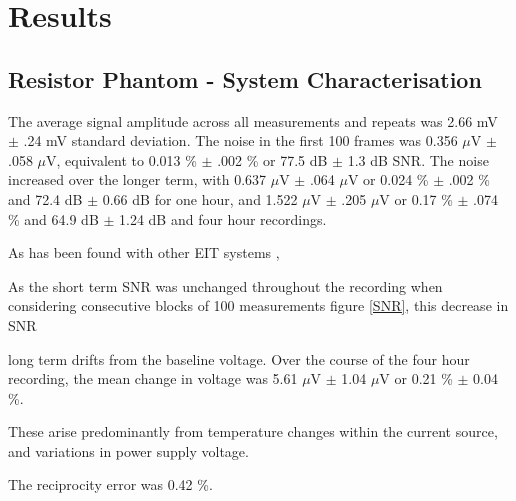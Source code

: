\section{Results}
\subsection{Resistor Phantom - System Characterisation}
The average signal amplitude across all measurements and repeats was 2.66 mV $\pm$ .24 mV standard deviation. The noise in the first 100 frames was 0.356 $\mu$V $\pm$ .058 $\mu$V, equivalent to 0.013 \% $\pm$ .002 \% or 77.5 dB $\pm$ 1.3 dB SNR. The noise increased over the longer term, with 0.637 $\mu$V $\pm$ .064 $\mu$V or 0.024 \% $\pm$ .002 \% and 72.4 dB $\pm$ 0.66 dB for one hour, and 1.522 $\mu$V $\pm$ .205 $\mu$V or 0.17 \% $\pm$ .074 \% and 64.9 dB $\pm$ 1.24 dB and four hour recordings.

As has been found with other EIT systems \cite{oh2007multi},



As the short term SNR was unchanged throughout the recording when considering consecutive blocks of 100 measurements figure \ref{SNR}, this decrease in SNR 


long term drifts from the baseline voltage. Over the course of the four hour recording, the mean change in voltage was 5.61 $\mu$V $\pm$ 1.04 $\mu$V or 0.21 \% $\pm$ 0.04 \%. 


These arise predominantly from temperature changes within the current source, and variations in power supply voltage.

The reciprocity error was 0.42 \%. 
